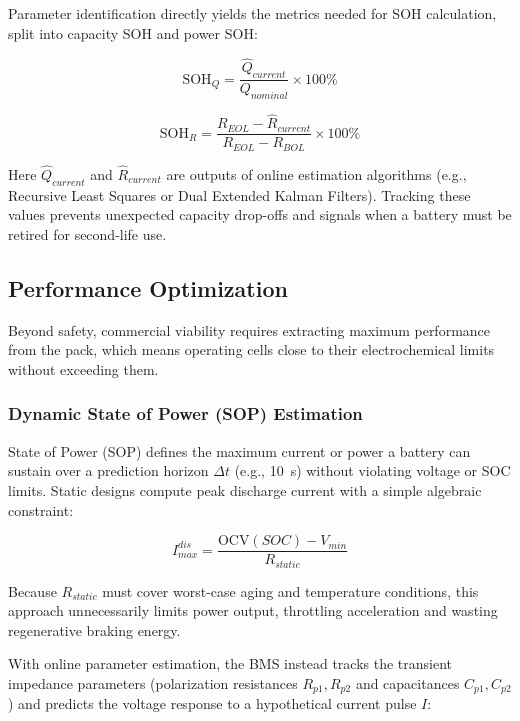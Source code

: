 Parameter identification directly yields the metrics needed for SOH calculation, split into capacity SOH and power SOH:

\begin{equation}
\label{eq:sohq}
\text{SOH}_Q = \frac{\hat{Q}_{current}}{Q_{nominal}} \times 100\%
\end{equation}

\begin{equation}
\label{eq:sohr}
\text{SOH}_R = \frac{R_{EOL} - \hat{R}_{current}}{R_{EOL} - R_{BOL}} \times 100\%
\end{equation}

\noindent Here $\hat{Q}_{current}$ and $\hat{R}_{current}$ are outputs of online estimation algorithms (e.g., Recursive Least Squares or Dual Extended Kalman Filters). Tracking these values prevents unexpected capacity drop-offs and signals when a battery must be retired for second-life use.

\subsection{Performance Optimization}
\label{subsec:performance_opt}

Beyond safety, commercial viability requires extracting maximum performance from the pack, which means operating cells close to their electrochemical limits without exceeding them.

\subsubsection{Dynamic State of Power (SOP) Estimation}

State of Power (SOP) defines the maximum current or power a battery can sustain over a prediction horizon $\Delta t$ (e.g., 10~s) without violating voltage or SOC limits. Static designs compute peak discharge current with a simple algebraic constraint:

\begin{equation}
\label{eq:sop_static}
I_{max}^{dis} = \frac{\text{OCV}(SOC) - V_{min}}{R_{static}}
\end{equation}

Because $R_{static}$ must cover worst-case aging and temperature conditions, this approach unnecessarily limits power output, throttling acceleration and wasting regenerative braking energy.

With online parameter estimation, the BMS instead tracks the transient impedance parameters (polarization resistances $R_{p1}, R_{p2}$ and capacitances $C_{p1}, C_{p2}$) and predicts the voltage response to a hypothetical current pulse $I$:

